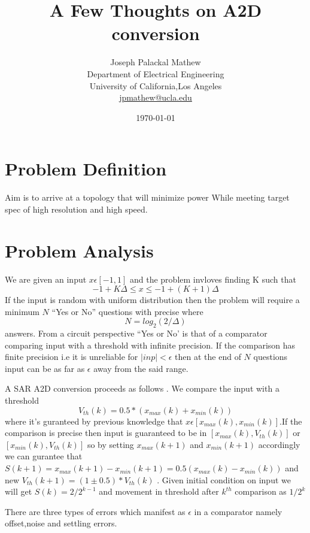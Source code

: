 \documentclass[a4paper,10pt,fleqn,titlepage,twoside]{article}
\title{A Few Thoughts on A2D conversion}
\author{
        Joseph Palackal Mathew \\
	Department of Electrical Engineering\\
        University of California,Los Angeles\\ 
	\href{mailto:jpmathew@ucla.edi}{jpmathew@ucla.edu}
}
\date{\today}
\begin{document}
\maketitle

\section*{Problem Definition}
Aim is to arrive at a topology that will minimize power While meeting target spec of high resolution and high speed.

\newpage

\section*{Problem Analysis}

We are given an input $x\epsilon[-1,1]$ and the problem invloves finding K such that $$-1+K\Delta \leq x \leq -1+(K+1)\Delta$$ If the input
is random with uniform distribution then the problem will require a minimum $N$ ``Yes or No'' questions with precise where $$N=log_2(2/\Delta)$$
answers. From a circuit perspective ``Yes or No' is that of a comparator comparing input with a threshold with infinite precision. If the
comparison has finite precision i.e it is unreliable for $|inp| < \epsilon $ then at the end of $N$ questions input can be as far as
$\epsilon$ away from the said range.

A SAR A2D conversion proceeds as follows . We compare the input with a threshold $$V_{th}(k) = 0.5*(x_{max}(k)+x_{min}(k)) $$ where it's
guranteed by previous knowledge that $x \epsilon [x_{max}(k),x_{min}(k)]$.If the comparison is precise then input is guaranteed to be in
$[x_{max}(k),V_{th}(k)]$ or $[x_{min}(k),V_{th}(k)]$ so by setting $x_{max}(k+1)$ and $x_{min}(k+1)$ accordingly we can gurantee that
$S(k+1)=x_{max}(k+1)-x_{min}(k+1) = 0.5(x_{max}(k)-x_{min}(k))$ and new $V_{th}(k+1) =(1 \pm 0.5 )*V_{th}(k)$ . Given initial condition
on input we will get $S(k)=2/2^{k-1}$ and movement in threshold after $k^{th}$ comparison as $1/2^k$

There are three types of errors which manifest as $\epsilon$ in a comparator namely offset,noise and settling errors.
\end{document}

